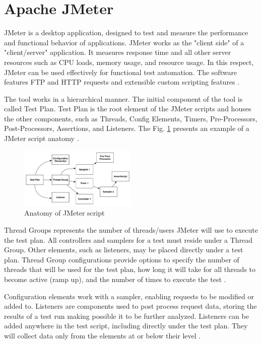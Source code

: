\section{Apache JMeter}

JMeter is a desktop application, designed to test and measure the performance and functional behavior of applications. JMeter works  as the "client side" of a "client/server" application. It measures response time and all other server resources such as CPU loads, memory usage, and resource usage. In this respect, JMeter can be used effectively for functional test automation. The software features FTP and HTTP requests and extensible custom scripting features \cite{Nevedrov2007}.

The tool works in a hierarchical manner. The initial component of the tool is called Test Plan. Test Plan is the root element of the JMeter scripts and houses the other components, such as Threads, Config Elements, Timers, Pre-Processors, Post-Processors, Assertions, and Listeners. The Fig. \ref{fig:jmeteranatomy} presents an example of a JMeter script anatomy \cite{Erinle2013}.

\begin{figure}[!ht]
\centering
\includegraphics[width=0.5\textwidth]{./images/jmeteranatomy.png}
\caption{Anatomy of JMeter script \cite{Erinle2013}}
\label{fig:jmeteranatomy}
\end{figure}

Thread Groups represents the number of threads/users JMeter will use to execute the test plan. All controllers and samplers for a test must reside under a Thread Group. Other elements, such as listeners, may be placed directly under a test plan. Thread Group configurations provide options to specify the number of threads that will be used for the test plan, how long it will take for all threads to become active (ramp up), and the number of times to execute the test \cite{Erinle2013}.

Configuration elements work with a sampler, enabling requests to be modified or added to. Listeners are components  used to post process request data, storing the results of a test run making possible it to be further analyzed.  Listeners can be added anywhere in the test script, including directly under the test plan. They will collect data only from the elements at or below their level \cite{Erinle2013} \cite{Nevedrov2007} \cite{Halili2008}. 

